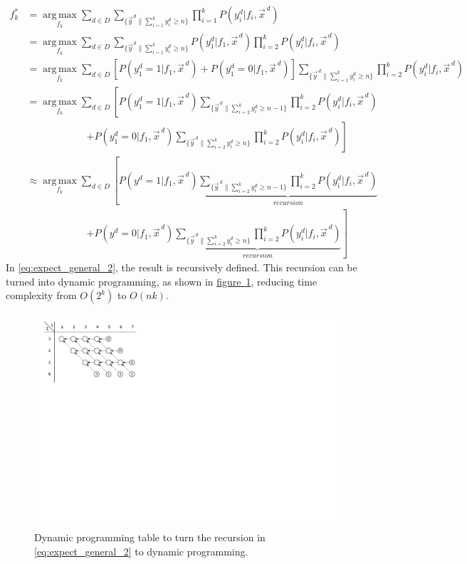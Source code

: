 \documentclass[11pt,a4paper]{article}
\begin{document}
\begin{align}
f_k^*&=\operatorname*{arg\,max}_{f_k}\sum_{d\in D}\sum_{\{\vec{y}^{\,d}\|\sum_{i=1}^ky_i^d\geq n\}}\prod_{i=1}^kP\left(y_i^d|f_i,\vec{x}^{\,d}\right)\nonumber\\
&=\operatorname*{arg\,max}_{f_k}\sum_{d\in D}\sum_{\{\vec{y}^{\,d}\|\sum_{i=1}^ky_i^d\geq n\}}P\left(y_1^d|f_1,\vec{x}^{\,d}\right)\prod_{i=2}^kP\left(y_i^d|f_i,\vec{x}^{\,d}\right)\nonumber\\
&=\operatorname*{arg\,max}_{f_k}\sum_{d\in D}\left[P\left(y_1^d=1|f_1,\vec{x}^{\,d}\right)+P\left(y_1^d=0|f_1,\vec{x}^{\,d}\right)\right]\sum_{\{\vec{y}^{\,d}\|\sum_{i=1}^ky_i^d\geq n\}}\prod_{i=2}^kP\left(y_i^d|f_i,\vec{x}^{\,d}\right)\nonumber\\
&=\operatorname*{arg\,max}_{f_k}\sum_{d\in D}\left[P\left(y_1^d=1|f_1,\vec{x}^{\,d}\right)\sum_{\{\vec{y}^{\,d}\|\sum_{i=2}^ky_i^d\geq n-1\}}\prod_{i=2}^kP\left(y_i^d|f_i,\vec{x}^{\,d}\right)\right.\nonumber\\ &\hspace{6em}\left.+P\left(y_1^d=0|f_1,\vec{x}^{\,d}\right)\sum_{\{\vec{y}^{\,d}\|\sum_{i=2}^ky_i^d\geq n\}}\prod_{i=2}^kP\left(y_i^d|f_i,\vec{x}^{\,d}\right)\right]\nonumber\\
&\approx\operatorname*{arg\,max}_{f_k}\sum_{d\in D}\left[P\left(y^d=1|f_1,\vec{x}^{\,d}\right)\underbrace{\sum_{\{\vec{y}^{\,d}\|\sum_{i=2}^ky_i^d\geq n-1\}}\prod_{i=2}^kP\left(y_i^d|f_i,\vec{x}^{\,d}\right)}_{recursion}\right.\nonumber\\ &\hspace{6em}\left.+P\left(y^d=0|f_1,\vec{x}^{\,d}\right)\underbrace{\sum_{\{\vec{y}^{\,d}\|\sum_{i=2}^ky_i^d\geq n\}}\prod_{i=2}^kP\left(y_i^d|f_i,\vec{x}^{\,d}\right)}_{recursion}\right]\label{eq:expect_general_2}
\end{align}
In \eqref{eq:expect_general_2}, the result is recursively defined. This recursion can be turned into dynamic programming, as shown in \hyperref[fig:dp]{figure~\ref{fig:dp}}, reducing time complexity from $O\left(2^k\right)$ to $O\left(nk\right).$

\begin{figure}[htbp]
	\centering
	\includegraphics[scale=0.8]{Plots_5.pdf}
	\caption{Dynamic programming table to turn the recursion in \eqref{eq:expect_general_2} to dynamic programming.}
	\label{fig:dp}
\end{figure}
\end{document}
